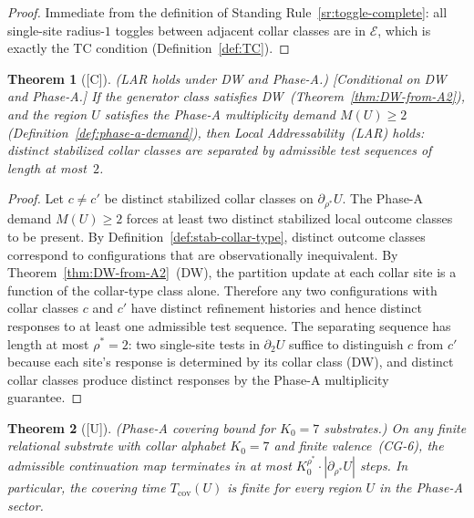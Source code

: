 \documentclass[12pt,oneside]{amsbook}
\theoremstyle{plain}
\newtheorem{theorem}{Theorem}[section]
\theoremstyle{definition}
\theoremstyle{remark}
\newcommand{\status}[1]{\textup{[#1]}}
\begin{document}
\begin{proof}
Immediate from the definition of Standing
Rule~\ref{sr:toggle-complete}: all single-site radius-$1$ toggles
between adjacent collar classes are in $\mathcal{E}$, which is exactly
the TC condition (Definition~\ref{def:TC}).
\end{proof}

\begin{theorem}[\status{C}]\label{thm:LAR-from-DW-PhA}
\textup{(LAR holds under DW and Phase-A.)}
\textup{[Conditional on DW and Phase-A.]}
If the generator class satisfies DW~(Theorem~\ref{thm:DW-from-A2}),
and the region $U$ satisfies the Phase-A multiplicity demand
$M(U) \geq 2$ (Definition~\ref{def:phase-a-demand}), then
Local Addressability~(LAR) holds: distinct stabilized collar classes
are separated by admissible test sequences of length at most~$2$.
\end{theorem}

\begin{proof}
Let $c \neq c'$ be distinct stabilized collar classes on
$\partial_{\rho^*} U$.  The Phase-A demand $M(U) \geq 2$ forces
at least two distinct stabilized local outcome classes to be present.
By Definition~\ref{def:stab-collar-type}, distinct outcome classes
correspond to configurations that are observationally inequivalent.
By Theorem~\ref{thm:DW-from-A2}~(DW), the partition update at each
collar site is a function of the collar-type class alone.  Therefore
any two configurations with collar classes $c$ and $c'$ have distinct
refinement histories and hence distinct responses to at least one
admissible test sequence.  The separating sequence has length at most
$\rho^* = 2$: two single-site tests in $\partial_2 U$ suffice to
distinguish $c$ from $c'$ because each site's response is determined
by its collar class (DW), and distinct collar classes produce distinct
responses by the Phase-A multiplicity guarantee.
\end{proof}

\begin{theorem}[\status{U}]\label{thm:covering-bound-K07}
\textup{(Phase-A covering bound for $K_0 = 7$ substrates.)}
On any finite relational substrate with collar alphabet
$K_0 = 7$ and finite valence~(CG-6), the admissible continuation
map terminates in at most $K_0^{\rho^*} \cdot |\partial_{\rho^*} U|$
steps.  In particular, the covering time $T_{\mathrm{cov}}(U)$ is
finite for every region $U$ in the Phase-A sector.
\end{theorem}
\end{document}
